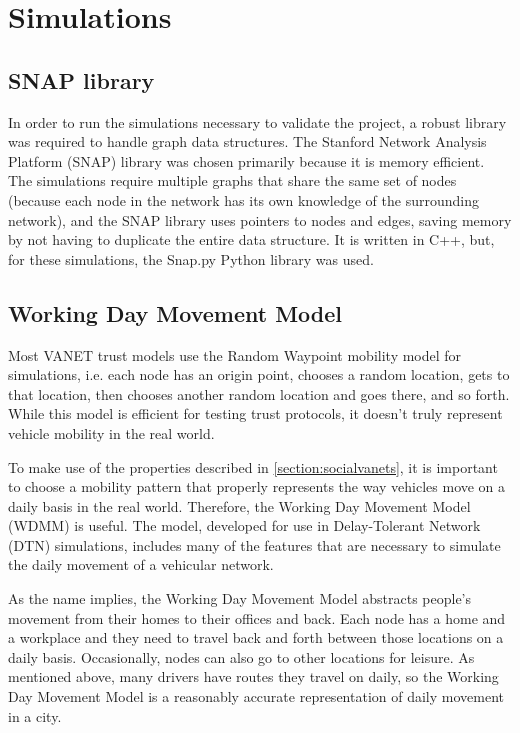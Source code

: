 \chapter{Simulations}
\label{chap:simulations}

\section{SNAP library}
\label{section:snap}
In order to run the simulations necessary to validate the project, a robust library was required to handle graph data structures.
The Stanford Network Analysis Platform (SNAP) library \cite{snap} was chosen primarily because it is memory efficient.
The simulations require multiple graphs that share the same set of nodes (because each node in the network has its own knowledge of the surrounding network), and the SNAP library uses pointers to nodes and edges, saving memory by not having to duplicate the entire data structure.
It is written in C++, but, for these simulations, the Snap.py Python library was used.


\section{Working Day Movement Model}
\label{section:workingday}

Most VANET trust models use the Random Waypoint mobility model for simulations, i.e. each node has an origin point, chooses a random location, gets to that location, then chooses another random location and goes there, and so forth.
While this model is efficient for testing trust protocols, it doesn't truly represent vehicle mobility in the real world.

To make use of the properties described in \autoref{section:socialvanets}, it is important to choose a mobility pattern that properly represents the way vehicles move on a daily basis in the real world.
Therefore, the Working Day Movement Model \cite{ekman2008working} (WDMM) is useful.
The model, developed for use in Delay-Tolerant Network (DTN) simulations, includes many of the features that are necessary to simulate the daily movement of a vehicular network.

As the name implies, the Working Day Movement Model abstracts people's movement from their homes to their offices and back.
Each node has a home and a workplace and they need to travel back and forth between those locations on a daily basis.
Occasionally, nodes can also go to other locations for leisure.
As mentioned above, many drivers have routes they travel on daily, so the Working Day Movement Model is a reasonably accurate representation of daily movement in a city.

